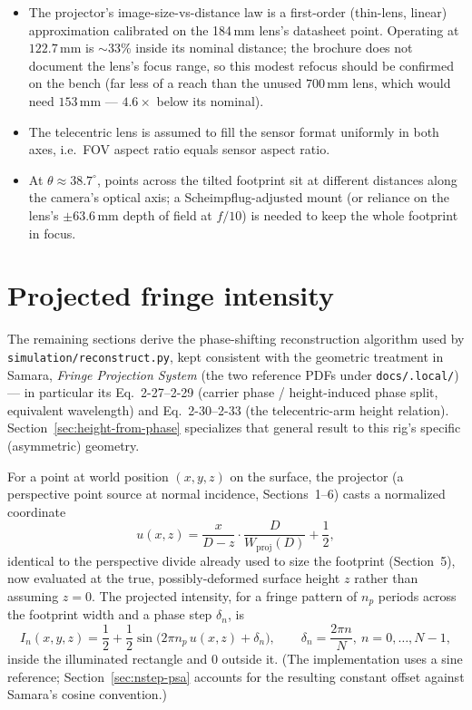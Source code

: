 \documentclass[11pt]{article}
\begin{document}
\begin{itemize}
  \item The projector's image-size-vs-distance law is a first-order
        (thin-lens, linear) approximation calibrated on the 184\,mm
        lens's datasheet point. Operating at $122.7$\,mm is $\sim$33\%
        inside its nominal distance; the brochure does not document the
        lens's focus range, so this modest refocus should be confirmed on
        the bench (far less of a reach than the unused $700$\,mm lens,
        which would need $153$\,mm --- $4.6\times$ below its nominal).
  \item The telecentric lens is assumed to fill the sensor format
        uniformly in both axes, i.e.\ FOV aspect ratio equals sensor
        aspect ratio.
  \item At $\theta \approx 38.7^\circ$, points across the tilted
        footprint sit at different distances along the camera's optical
        axis; a Scheimpflug-adjusted mount (or reliance on the lens's
        $\pm 63.6$\,mm depth of field at $f/10$) is needed to keep the
        whole footprint in focus.
\end{itemize}

\section{Projected fringe intensity}
\label{sec:fringe-intensity}

The remaining sections derive the phase-shifting reconstruction algorithm
used by \texttt{simulation/reconstruct.py}, kept consistent with the
geometric treatment in Samara, \emph{Fringe Projection System} (the two
reference PDFs under \texttt{docs/.local/}) --- in particular its
Eq.~2-27--2-29 (carrier phase / height-induced phase split, equivalent
wavelength) and Eq.~2-30--2-33 (the telecentric-arm height relation).
Section~\ref{sec:height-from-phase} specializes that general result to
this rig's specific (asymmetric) geometry.

For a point at world position $(x,y,z)$ on the surface, the projector (a
perspective point source at normal incidence, Sections~1--6) casts a
normalized coordinate
\begin{equation}
  u(x,z) = \frac{x}{D-z}\cdot\frac{D}{W_{\text{proj}}(D)} + \frac12,
\end{equation}
identical to the perspective divide already used to size the footprint
(Section~5), now evaluated at the true, possibly-deformed surface height
$z$ rather than assuming $z=0$. The projected intensity, for a fringe
pattern of $n_p$ periods across the footprint width and a phase step
$\delta_n$, is
\begin{equation}
  I_n(x,y,z) = \frac12 + \frac12\sin\bigl(2\pi n_p\, u(x,z) + \delta_n\bigr),
  \qquad \delta_n = \frac{2\pi n}{N},\ n = 0,\dots,N-1,
  \label{eq:intensity}
\end{equation}
inside the illuminated rectangle and $0$ outside it. (The implementation
uses a sine reference; Section~\ref{sec:nstep-psa} accounts for the
resulting constant offset against Samara's cosine convention.)
\end{document}
